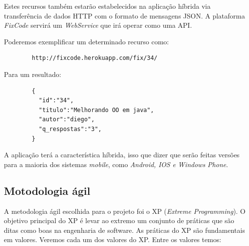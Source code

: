 \documentclass[
	article,			%
	11pt,				%
	oneside,			%
	a4paper,			%
	english,			%
	brazil,				%
	sumario=tradicional
	]{abntex2}
\begin{document}
Estes recursos também estarão estabelecidos na aplicação híbrida via transferência de dados HTTP com o formato de mensagens JSON. A plataforma \textit{FixCode} servirá um \textit{WebService} que irá operar como uma API.

Poderemos exemplificar um determinado recurso como:

\begin{lstlisting}
		http://fixcode.herokuapp.com/fix/34/
\end{lstlisting}

Para um resultado:

\begin{lstlisting}
		{
		  "id":"34",
		  "titulo":"Melhorando OO em java",
		  "autor":"diego",
		  "q_respostas":"3",
		}
\end{lstlisting}

A aplicação terá a característica híbrida, isso que dizer que serão feitas versões para a maioria dos sistemas \textit{mobile}, como \textit{Android, IOS e Windows Phone}.

\subsection{Motodologia ágil}

A metodologia ágil escolhida para o projeto foi o XP (\textit{Extreme Programming}). O objetivo principal do XP é levar ao extremo um conjunto de práticas que são ditas como boas na engenharia de software. As práticas do XP são fundamentais em valores. Veremos cada um dos valores do XP. Entre os valores temos:
\end{document}
